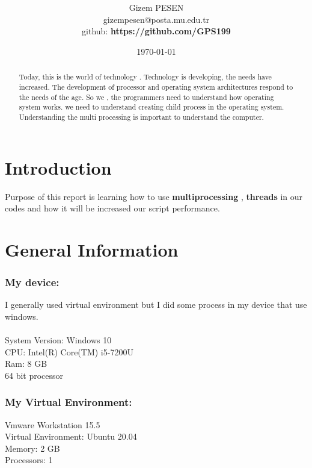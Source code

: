 \documentclass[onecolumn]{article}
\title{\spacecaps{Assignment Report 2: Child Process and Multiprocessing}\\ \normalsize \spacesc{CENG2034, Operating Systems} }
\author{Gizem PESEN\\gizempesen@posta.mu.edu.tr\\github: \textbf{https://github.com/GPS199}}
\date{\today}
\begin{document}
\maketitle

\begin{abstract}

Today, this is the world of technology . Technology is developing, the needs have increased. The development of processor and operating system architectures respond to the needs of the age. So  we , the programmers  need to understand how operating system works. we need to understand creating child process in the operating system. Understanding the multi processing is important to understand the computer. 
\end{abstract}


\section{Introduction}
Purpose of this report is learning how to use \textbf{multiprocessing} ,\textbf{ threads }in our codes and how it will be increased our script performance.

\section{General Information}

\subsubsection{My device: }
I generally used virtual environment but I did some process in my device that use windows. \\ \\
System Version: Windows 10 \\
 CPU: Intel(R) Core(TM) i5-7200U  \\
 Ram: 8 GB  \\
 64 bit processor \\
 
\subsubsection{My Virtual Environment:  }
Vmware Workstation 15.5 \\ 
Virtual Environment: Ubuntu 20.04  \\  
Memory:  2 GB \\
Processors: 1 \\
\end{document}
